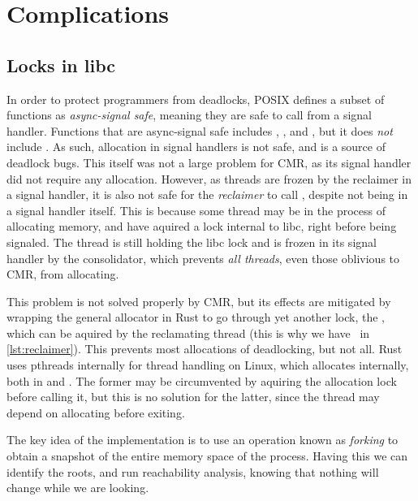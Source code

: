 \section{Complications}
\blindtext%


\subsection{Locks in libc\label{sec:alloc-lock}}

In order to protect programmers from deadlocks, POSIX defines a subset of functions as
\emph{async-signal safe}, meaning they are safe to call from a signal handler. Functions that are
async-signal safe includes , , and , but it does \emph{not}
include . As such, allocation in signal handlers is not safe, and is a source of
deadlock bugs. This itself was not a large problem for CMR, as its signal handler did not require
any allocation. However, as threads are frozen by the reclaimer in a signal handler, it is also not
safe for the \emph{reclaimer} to call , despite not being in a signal handler itself.
This is because some thread may be in the process of allocating memory, and have aquired a lock
internal to libc, right before being signaled. The thread is still holding the libc lock and is
frozen in its signal handler by the consolidator, which prevents \emph{all threads}, even those
oblivious to CMR, from allocating.

This problem is not solved properly by CMR, but its effects are mitigated by wrapping the general
allocator in Rust to go through yet another lock, the , which can be aquired by
the reclamating thread (this is why we have~ in \cref{lst:reclaimer}). This
prevents most allocations of deadlocking, but not all. Rust uses \gls{pthreads} internally for thread
handling on Linux, which allocates internally, both in  and . The former may
be circumvented by aquiring the allocation lock before calling it, but this is no solution for the
latter, since the thread may depend on allocating before exiting.




\clearpage
\vspace{2cm}


The key idea of the implementation is to use an operation known as \emph{forking} to obtain a
snapshot of the entire memory space of the process. Having this we can identify the roots, and run
reachability analysis, knowing that nothing will change while we are looking.

